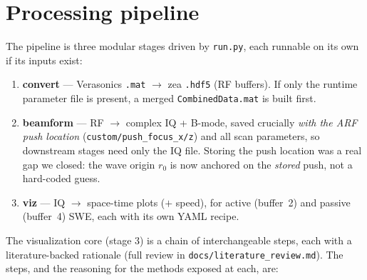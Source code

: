 \documentclass[11pt,a4paper]{article}
\begin{document}
\section{Processing pipeline}\label{sec:pipeline}
The pipeline is three modular stages driven by \texttt{run.py}, each runnable on its own if its inputs
exist:
\begin{enumerate}
  \item \textbf{convert} --- Verasonics \texttt{.mat} $\rightarrow$ zea \texttt{.hdf5} (RF buffers). If only
  the runtime parameter file is present, a merged \texttt{CombinedData.mat} is built first.
  \item \textbf{beamform} --- RF $\rightarrow$ complex IQ + B-mode, saved crucially \emph{with the ARF push
  location} (\texttt{custom/push\_focus\_x/z}) and all scan parameters, so downstream stages need only the IQ
  file. Storing the push location was a real gap we closed: the wave origin $r_0$ is now anchored on the
  \emph{stored} push, not a hard-coded guess.
  \item \textbf{viz} --- IQ $\rightarrow$ space-time plots ($+$ speed), for active (buffer~2) and passive
  (buffer~4) SWE, each with its own YAML recipe.
\end{enumerate}

The visualization core (stage 3) is a chain of interchangeable steps, each with a literature-backed rationale
(full review in \texttt{docs/literature\_review.md}). The steps, and the reasoning for the methods exposed at
each, are:
\end{document}
